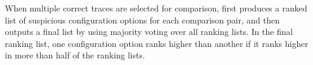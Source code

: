 When multiple correct traces are selected for comparison,
\ourtool first produces a ranked list of suspicious
configuration options for each comparison pair, and then outputs
a final list by using majority voting over all ranking lists.
In the final ranking list, one configuration option ranks higher
than another if it ranks higher in more than half of the ranking lists.



